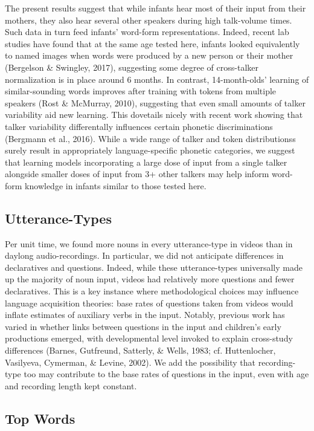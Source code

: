 \documentclass[man]{apa6}
\theoremstyle{definition}
\theoremstyle{definition}
\theoremstyle{definition}
\theoremstyle{remark}
\begin{document}
The present results suggest that while infants hear most of their input
from their mothers, they also hear several other speakers during high
talk-volume times. Such data in turn feed infants' word-form
representations. Indeed, recent lab studies have found that at the same
age tested here, infants looked equivalently to named images when words
were produced by a new person or their mother (Bergelson \& Swingley,
2017), suggesting some degree of cross-talker normalization is in place
around 6 months. In contrast, 14-month-olds' learning of
similar-sounding words improves after training with tokens from multiple
speakers (Rost \& McMurray, 2010), suggesting that even small amounts of
talker variability aid new learning. This dovetails nicely with recent
work showing that talker variability differentally influences certain
phonetic discriminations (Bergmann et al., 2016). While a wide range of
talker and token distributionss surely result in appropriately
language-specific phonetic categories, we suggest that learning models
incorporating a large dose of input from a single talker alongside
smaller doses of input from 3+ other talkers may help inform word-form
knowledge in infants similar to those tested here.

\subsection{Utterance-Types}\label{utterance-types}

Per unit time, we found more nouns in every utterance-type in videos
than in daylong audio-recordings. In particular, we did not anticipate
differences in declaratives and questions. Indeed, while these
utterance-types universally made up the majority of noun input, videos
had relatively more questions and fewer declaratives. This is a key
instance where methodological choices may influence language acquisition
theories: base rates of questions taken from videos would inflate
estimates of auxiliary verbs in the input. Notably, previous work has
varied in whether links between questions in the input and children's
early productions emerged, with developmental level invoked to explain
cross-study differences (Barnes, Gutfreund, Satterly, \& Wells, 1983;
cf. Huttenlocher, Vasilyeva, Cymerman, \& Levine, 2002). We add the
possibility that recording-type too may contribute to the base rates of
questions in the input, even with age and recording length kept
constant.

\subsection{Top Words}\label{top-words}
\end{document}
